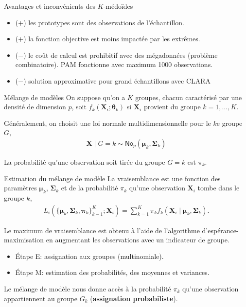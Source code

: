 \documentclass[
  ignorenonframetext,
]{beamer}
\providecommand{\tightlist}{%
  \setlength{\itemsep}{0pt}\setlength{\parskip}{0pt}}\usepackage{longtable,booktabs,array}
\begin{document}
\begin{frame}{Avantages et inconvénients des \(K\)-médoïdes}
\protect\hypertarget{avantages-et-inconvuxe9nients-des-k-muxe9douxefdes}{}
\begin{itemize}
\tightlist
\item
  (\(+\)) les prototypes sont des observations de l'échantillon.
\item
  (\(+\)) la fonction objective est moins impactée par les extrêmes.
\item
  (\(-\)) le coût de calcul est prohibitif avec des mégadonnées
  (problème combinatoire). PAM fonctionne avec maximum 1000
  observations.
\item
  (\(-\)) solution approximative pour grand échantillons avec CLARA
\end{itemize}
\end{frame}

\begin{frame}{Mélange de modèles}
\protect\hypertarget{muxe9lange-de-moduxe8les}{}
On suppose qu'on a \(K\) groupes, chacun caractérisé par une densité de
dimension \(p\), soit \(f_k(\boldsymbol{X}_i;\boldsymbol{\theta}_k)\) si
\(\boldsymbol{X}_i\) provient du groupe \(k=1, \ldots, K\).

Généralement, on choisit une loi normale multidimensionnelle pour le
\(k\)e groupe \(G\), \begin{align*}
\boldsymbol{X} \mid G=k \sim \mathsf{No}_p(\boldsymbol{\mu}_k, \boldsymbol{\Sigma}_k)
\end{align*}

La probabilité qu'une observation soit tirée du groupe \(G=k\) est
\(\pi_k\).
\end{frame}

\begin{frame}{Estimation du mélange de modèle}
\protect\hypertarget{estimation-du-muxe9lange-de-moduxe8le}{}
La vraisemblance est une fonction des paramètres \(\boldsymbol{\mu}_k\),
\(\boldsymbol{\Sigma}_k\) et de la probabilité \(\pi_k\) qu'une
observation \(\mathbf{X}_i\) tombe dans le groupe \(k\), \begin{align*}
 L_i(\{\boldsymbol{\mu}_k, \boldsymbol{\Sigma}_k, \boldsymbol{\pi}_k\}_{k-1}^K; \mathbf{X}_i)= \sum_{k=1}^K\pi_k
f_{k}(\boldsymbol{X}_i \mid \boldsymbol{\mu}_k, \boldsymbol{\Sigma}_k).
\end{align*}

Le maximum de vraisemblance est obtenu à l'aide de l'algorithme
d'espérance-maximisation en augmentant les observations avec un
indicateur de groupe.

\begin{itemize}
\tightlist
\item
  Étape E: assignation aux groupes (multinomiale).
\item
  Étape M: estimation des probabilités, des moyennes et variances.
\end{itemize}

Le mélange de modèle nous donne accès à la probabilité \(\pi_k\) qu'une
observation appartiennent au groupe \(G_k\) (\textbf{assignation
probabiliste}).
\end{frame}
\end{document}
